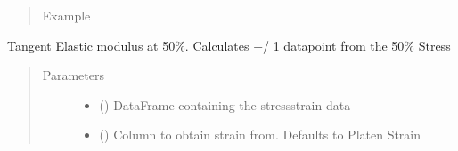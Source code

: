 \documentclass[letterpaper,10pt,english]{sphinxmanual}
\begin{document}
\begin{fulllineitems}
\begin{fulllineitems}
\begin{quote}
\begin{description}
\item[{Example}] \leavevmode
\begin{sphinxVerbatim}[commandchars=\\\{\}]
  
  
 
  
\end{sphinxVerbatim}

\end{description}\end{quote}

\end{fulllineitems}


\begin{fulllineitems}
\label{\detokenize{openfdem:openfdem.openfdem.Model.Etan50_mod}}
Tangent Elastic modulus at 50\%. Calculates +/\sphinxhyphen{} 1 datapoint from the 50\% Stress
\begin{quote}\begin{description}
\item[{Parameters}] \leavevmode\begin{itemize}
\item {} 
 () \textendash{} DataFrame containing the stress\sphinxhyphen{}strain data

\item {} 
 () \textendash{} Column to obtain strain from. Defaults to Platen Strain


\end{itemize}
\end{description}
\end{quote}
\end{fulllineitems}
\end{fulllineitems}
\end{document}
